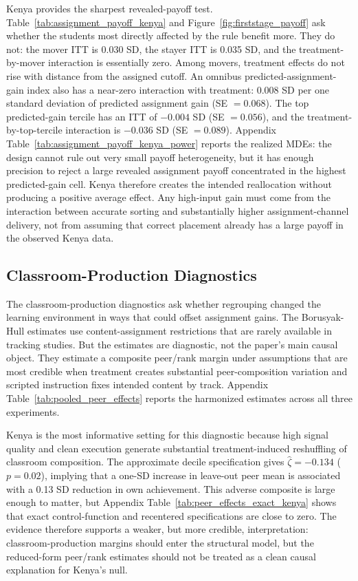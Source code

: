 \documentclass[11pt]{article}
\begin{document}
Kenya provides the sharpest revealed-payoff test. Table~\ref{tab:assignment_payoff_kenya} and Figure~\ref{fig:firststage_payoff} ask whether the students most directly affected by the rule benefit more. They do not: the mover ITT is 0.030 SD, the stayer ITT is 0.035 SD, and the treatment-by-mover interaction is essentially zero. Among movers, treatment effects do not rise with distance from the assigned cutoff. An omnibus predicted-assignment-gain index also has a near-zero interaction with treatment: 0.008 SD per one standard deviation of predicted assignment gain (SE $=0.068$). The top predicted-gain tercile has an ITT of $-0.004$ SD (SE $=0.056$), and the treatment-by-top-tercile interaction is $-0.036$ SD (SE $=0.089$). Appendix Table~\ref{tab:assignment_payoff_kenya_power} reports the realized MDEs: the design cannot rule out very small payoff heterogeneity, but it has enough precision to reject a large revealed assignment payoff concentrated in the highest predicted-gain cell. Kenya therefore creates the intended reallocation without producing a positive average effect. Any high-input gain must come from the interaction between accurate sorting and substantially higher assignment-channel delivery, not from assuming that correct placement already has a large payoff in the observed Kenya data.

\subsection{Classroom-Production Diagnostics}

The classroom-production diagnostics ask whether regrouping changed the learning environment in ways that could offset assignment gains. The Borusyak-Hull estimates use content-assignment restrictions that are rarely available in tracking studies. But the estimates are diagnostic, not the paper's main causal object. They estimate a composite peer/rank margin under assumptions that are most credible when treatment creates substantial peer-composition variation and scripted instruction fixes intended content by track. Appendix Table~\ref{tab:pooled_peer_effects} reports the harmonized estimates across all three experiments.

Kenya is the most informative setting for this diagnostic because high signal quality and clean execution generate substantial treatment-induced reshuffling of classroom composition. The approximate decile specification gives $\hat{\zeta}=-0.134$ ($p=0.02$), implying that a one-SD increase in leave-out peer mean is associated with a 0.13 SD reduction in own achievement. This adverse composite is large enough to matter, but Appendix Table~\ref{tab:peer_effects_exact_kenya} shows that exact control-function and recentered specifications are close to zero. The evidence therefore supports a weaker, but more credible, interpretation: classroom-production margins should enter the structural model, but the reduced-form peer/rank estimates should not be treated as a clean causal explanation for Kenya's null.
\end{document}
